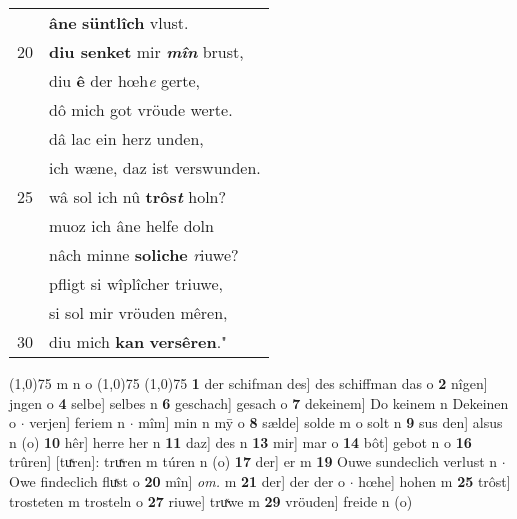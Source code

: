 \documentclass[8pt,a4paper,notitlepage]{article}
\begin{document}
\begin{table}[ht]
\begin{minipage}[t]{0.5\linewidth}
\begin{tabular}{rl}
 & \textbf{âne} \textbf{süntlîch} vlust.\\ 
20 & \textbf{diu senket} mir \textit{\textbf{mîn}} brust,\\ 
 & diu \textbf{ê} der hœh\textit{e} gerte,\\ 
 & dô mich got vröude werte.\\ 
 & dâ lac ein herz unden,\\ 
 & ich wæne, daz ist verswunden.\\ 
25 & wâ sol ich nû \textbf{trôs\textit{t}} holn?\\ 
 & muoz ich âne helfe doln\\ 
 & nâch minne \textbf{soliche} \textit{r}iuwe?\\ 
 & pfligt si wîplîcher triuwe,\\ 
 & si sol mir vröuden mêren,\\ 
30 & diu mich \textbf{kan} \textbf{versêren}."\\ 
\end{tabular}
\scriptsize
\line(1,0){75} \newline
m n o \newline
\line(1,0){75} \newline
\newline
\line(1,0){75} \newline
\textbf{1} der schifman des] des schiffman das o \textbf{2} nîgen] jngen o \textbf{4} selbe] selbes n \textbf{6} geschach] gesach o \textbf{7} dekeinem] Do keinem n Dekeinen o  $\cdot$ verjen] feriem n  $\cdot$ mîm] min n mȳ o \textbf{8} sælde] solde m o solt n \textbf{9} sus den] alsus n (o) \textbf{10} hêr] herre her n \textbf{11} daz] des n \textbf{13} mir] mar o \textbf{14} bôt] gebot n o \textbf{16} trûren] [tuͯren]: truͯren m túren n (o) \textbf{17} der] er m \textbf{19} Ouwe sundeclich verlust n  $\cdot$ Owe findeclich fluͯst o \textbf{20} mîn] \textit{om.} m \textbf{21} der] der der o  $\cdot$ hœhe] hohen m \textbf{25} trôst] trosteten m trosteln o \textbf{27} riuwe] truͯwe m \textbf{29} vröuden] freide n (o) \newline
\end{minipage}
\end{table}
\newpage
\end{document}
